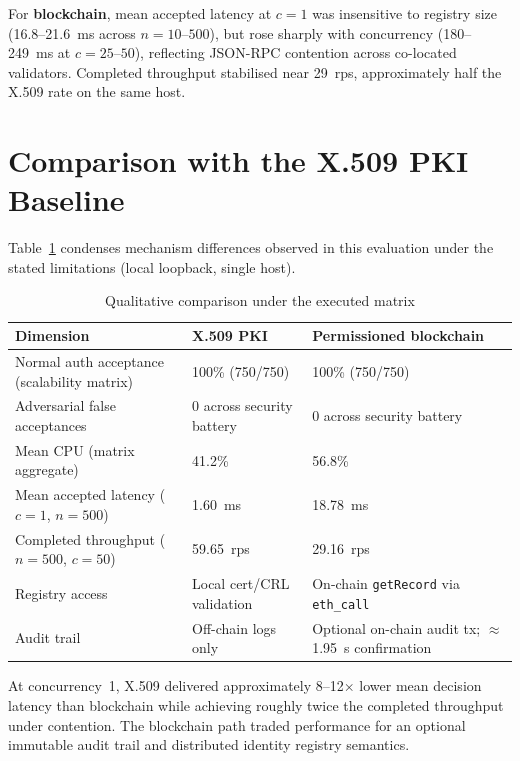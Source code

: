 For \textbf{blockchain}, mean accepted latency at $c=1$ was insensitive to registry size (16.8--21.6~ms across $n=10$--$500$), but rose sharply with concurrency (180--249~ms at $c=25$--$50$), reflecting JSON-RPC contention across co-located validators. Completed throughput stabilised near 29~rps, approximately half the X.509 rate on the same host.


\section{Comparison with the X.509 PKI Baseline}
\label{sec:ch5-comparison}

Table~\ref{tab:ch5-comparison} condenses mechanism differences observed in this evaluation under the stated limitations (local loopback, single host).

\begin{table}[htbp]
    \centering
    \caption{Qualitative comparison under the executed matrix}
    \label{tab:ch5-comparison}
    \begin{tabular}{|p{}|p{}|p{}|}
        \hline
        \textbf{Dimension} & \textbf{X.509 PKI} & \textbf{Permissioned blockchain} \\
        \hline
        Normal auth acceptance (scalability matrix) & 100\% (750/750) & 100\% (750/750) \\
        \hline
        Adversarial false acceptances & 0 across security battery & 0 across security battery \\
        \hline
        Mean CPU (matrix aggregate) & 41.2\% & 56.8\% \\
        \hline
        Mean accepted latency ($c=1$, $n=500$) & 1.60~ms & 18.78~ms \\
        \hline
        Completed throughput ($n=500$, $c=50$) & 59.65~rps & 29.16~rps \\
        \hline
        Registry access & Local cert/CRL validation & On-chain \texttt{getRecord} via \texttt{eth\_call} \\
        \hline
        Audit trail & Off-chain logs only & Optional on-chain audit tx; $\approx$ 1.95~s confirmation \\
        \hline
    \end{tabular}
\end{table}

At concurrency~1, X.509 delivered approximately 8--12$\times$ lower mean decision latency than blockchain while achieving roughly twice the completed throughput under contention. The blockchain path traded performance for an optional immutable audit trail and distributed identity registry semantics.


